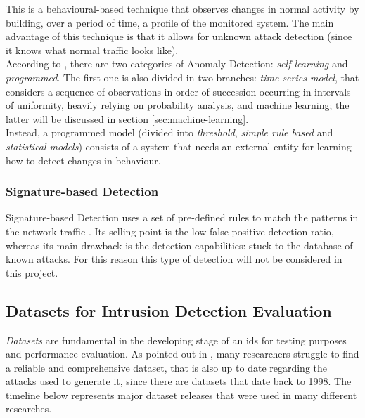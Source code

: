 This is a behavioural-based technique that observes changes in normal activity by building, over a period of time, a profile of the monitored system. The main advantage of this technique is that it allows for unknown attack detection (since it knows what normal traffic looks like). \\ According to \cite{Hodo2017}, there are two categories of Anomaly Detection: \textit{self-learning} and \textit{programmed}. The first one is also divided in two branches: \textit{time series model}, that considers a sequence of observations in order of succession occurring in intervals of uniformity, heavily relying on probability analysis, and machine learning; the latter  will be discussed in section \ref{sec:machine-learning}. \\ Instead, a programmed model (divided into \textit{threshold}, \textit{simple rule based} and \textit{statistical models}) consists of a system that needs an external entity for learning how to detect changes in behaviour.

\subsubsection{Signature-based Detection}
\label{subsubsec:signature-detection}

Signature-based Detection uses a set of pre-defined rules to match the patterns in the network traffic \cite{Hodo2017}. Its selling point is the low false-positive detection ratio, whereas its main drawback is the detection capabilities: stuck to the database of known attacks. For this reason this type of detection will not be considered in this project.


\subsection{Datasets for Intrusion Detection Evaluation}
\label{subsec:datasets-for-evaluation}


\textit{Datasets} are fundamental in the developing stage of an \gls{ids} for testing purposes and performance evaluation. As pointed out in \cite{icissp18}, many researchers struggle to find a reliable and comprehensive dataset, that is also up to date regarding the attacks used to generate it, since there are datasets that date back to 1998. The timeline below represents major dataset releases that were used in many different researches.

